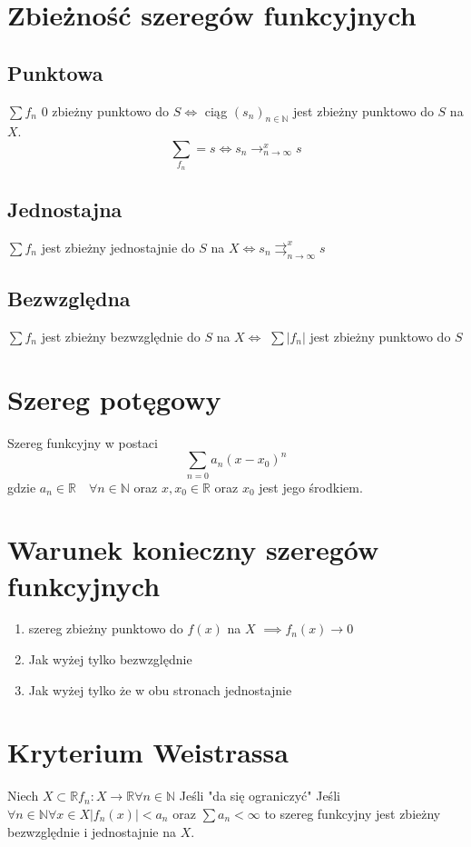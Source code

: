 \documentclass[11pt]{article}
\begin{document}
\section{Zbieżność szeregów funkcyjnych}
\subsection{Punktowa}
$\sum{f_n}$ 0 zbieżny punktowo do $S \iff$ ciąg
$(s_n)_{n \in \mathbb{N}}$ jest zbieżny punktowo do $S$ na $X$. 
$$ \sum_{f_n} = s \iff s_n \mathop{\longrightarrow}_{n \to \infty}^{x} s $$

\subsection{Jednostajna}
$\sum{f_n}$ jest zbieżny jednostajnie do $S$ na $X \iff
s_n \mathop{\rightrightarrows}_{n \to \infty}^{x} s$

\subsection{Bezwzględna}
$\sum{f_n}$ jest zbieżny bezwzględnie do $S$ na $X \iff$ $ \sum{|f_n|}$ jest zbieżny punktowo do $S$ 
\section{Szereg potęgowy}
Szereg funkcyjny w postaci $$ \sum_{n = 0}{a_n (x - x_0)^n} $$
gdzie $a_n \in \mathbb{R} \quad \forall n \in \mathbb{N}$
oraz $ x,x_0 \in \mathbb{R}$ oraz $x_0$ jest jego środkiem.

\section{Warunek konieczny szeregów funkcyjnych}
\begin{enumerate}
\item{
szereg zbieżny punktowo do $f(x)$ na $X$ $\implies f_n(x) \to 0 $}
\item{Jak wyżej tylko bezwzględnie}
\item{Jak wyżej tylko że w obu stronach jednostajnie}
\end{enumerate}

\section{Kryterium Weistrassa}
Niech $X \subset \mathbb{R} f_n : X \to \mathbb{R} \forall n \in \mathbb{N}$
Jeśli "da się ograniczyć"
Jeśli $\forall n \in \mathbb{N} \forall x \in X |f_n(x)| < a_n$ oraz $ \sum{a_n} < \infty $ to szereg funkcyjny jest zbieżny bezwzględnie i jednostajnie na $X$.
\end{document}
